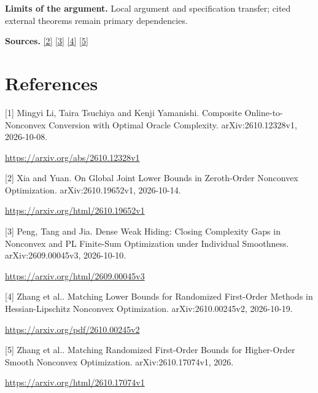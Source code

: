 \documentclass[10pt,a4paper]{article}
\begin{document}
\textbf{Limits of the argument.} Local argument and specification transfer; cited external theorems remain primary dependencies.

\textbf{Sources.} \href{https://arxiv.org/html/2610.19652v1}{[2]} \href{https://arxiv.org/html/2609.00045v3}{[3]} \href{https://arxiv.org/pdf/2610.00245v2}{[4]} \href{https://arxiv.org/html/2610.17074v1}{[5]}

\section{References}
[1] Mingyi Li, Taira Tsuchiya and Kenji Yamanishi. Composite Online-to-Nonconvex Conversion with Optimal Oracle Complexity. arXiv:2610.12328v1, 2026-10-08.

\url{https://arxiv.org/abs/2610.12328v1}

[2] Xia and Yuan. On Global Joint Lower Bounds in Zeroth-Order Nonconvex Optimization. arXiv:2610.19652v1, 2026-10-14.

\url{https://arxiv.org/html/2610.19652v1}

[3] Peng, Tang and Jia. Dense Weak Hiding: Closing Complexity Gaps in Nonconvex and PL Finite-Sum Optimization under Individual Smoothness. arXiv:2609.00045v3, 2026-10-10.

\url{https://arxiv.org/html/2609.00045v3}

[4] Zhang et al.. Matching Lower Bounds for Randomized First-Order Methods in Hessian-Lipschitz Nonconvex Optimization. arXiv:2610.00245v2, 2026-10-19.

\url{https://arxiv.org/pdf/2610.00245v2}

[5] Zhang et al.. Matching Randomized First-Order Bounds for Higher-Order Smooth Nonconvex Optimization. arXiv:2610.17074v1, 2026.

\url{https://arxiv.org/html/2610.17074v1}
\end{document}
